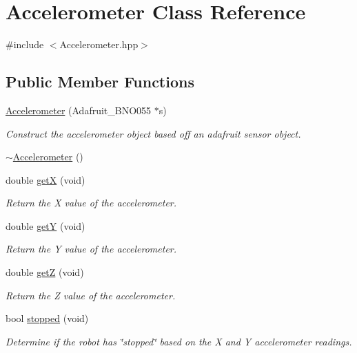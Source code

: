 \hypertarget{class_accelerometer}{}\section{Accelerometer Class Reference}
\label{class_accelerometer}


{\ttfamily \#include $<$Accelerometer.\+hpp$>$}

\subsection*{Public Member Functions}
\begin{DoxyCompactItemize}
\item 
\hyperlink{class_accelerometer_abf2355ca82838b64d7e4f00b0c23e65e}{Accelerometer} (Adafruit\+\_\+\+B\+N\+O055 $\ast$s)
\begin{DoxyCompactList}\small\item\em Construct the accelerometer object based off an adafruit sensor object. \end{DoxyCompactList}\item 
\hyperlink{class_accelerometer_acb6a7d9c61f2084ec4aec4a8ff35d622}{$\sim$\+Accelerometer} ()
\item 
double \hyperlink{class_accelerometer_a0570e1dd30592d3d4acc796fc4e67351}{getX} (void)
\begin{DoxyCompactList}\small\item\em Return the X value of the accelerometer. \end{DoxyCompactList}\item 
double \hyperlink{class_accelerometer_aba32b3d5b8a7c7f4e257f53551813b32}{getY} (void)
\begin{DoxyCompactList}\small\item\em Return the Y value of the accelerometer. \end{DoxyCompactList}\item 
double \hyperlink{class_accelerometer_a3d363ae0b29b5f17aff4b72f7a2b6a0d}{getZ} (void)
\begin{DoxyCompactList}\small\item\em Return the Z value of the accelerometer. \end{DoxyCompactList}\item 
bool \hyperlink{class_accelerometer_a88b653a985a23ebbed8916ef5a2cf0af}{stopped} (void)
\begin{DoxyCompactList}\small\item\em Determine if the robot has \char`\"{}stopped\char`\"{} based on the X and Y accelerometer readings. \end{DoxyCompactList}\end{DoxyCompactItemize}
